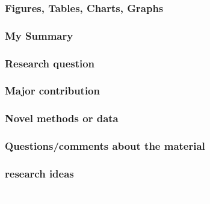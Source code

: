 \documentclass[12pt]{article}
\begin{document}
			\subsubsection*{Figures, Tables, Charts, Graphs}



			\subsubsection*{My Summary}

			

				\subsubsection*{Research question}

			

				\subsubsection*{Major contribution}

				

				\subsubsection*{Novel methods or data}



			\subsubsection*{Questions/comments about the material}



			\subsubsection*{research ideas}





\pagebreak



\pagebreak



	











\newpage

\singlespacing

{\textcolor{white}.}




\end{document}
